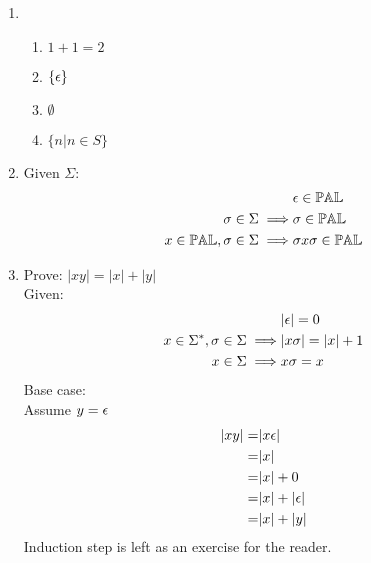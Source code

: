 \documentclass[10pt,a4paper]{report}
\begin{document}
\begin{enumerate}
\item
	\begin{enumerate}
	\item $1 + 1 = 2$
	\item $\{ \epsilon \}$
	\item $\emptyset$
	\item $\{ n | n \in S \}$
	\end{enumerate}
\item Given $\Sigma$:
	\begin{eqnarray*}
		&
		\epsilon \in \mathbb{PAL}
		\\
		\sigma \in \Sigma
		\implies &
		\sigma \in \mathbb{PAL}
		\\
		x \in \mathbb{PAL}, \sigma \in \Sigma
		\implies &
		\sigma x \sigma \in \mathbb{PAL}
	\end{eqnarray*}
\item
	Prove: $|xy| = |x| + |y|$ \\
	Given:
	\begin{eqnarray}
		&
		| \epsilon | = 0
		\\
		x\in\Sigma^*, \sigma \in \Sigma
		\implies &
		| x \sigma | = | x | + 1
		\\
		x \in \Sigma
		\implies &
		x\sigma = x
	\end{eqnarray}
	\setcounter{equation}{0}
	Base case:
	\\
	Assume $y = \epsilon$
	\begin{eqnarray*}
		      |xy|
		=&   | x \epsilon |
		\\=& |x|
		\\=& |x| + 0
		\\=& |x| + | \epsilon |
		\\=& |x| + |y|
	\end{eqnarray*}
	Induction step is left as an exercise for the reader.
	\done
\end{enumerate}
\end{document}
